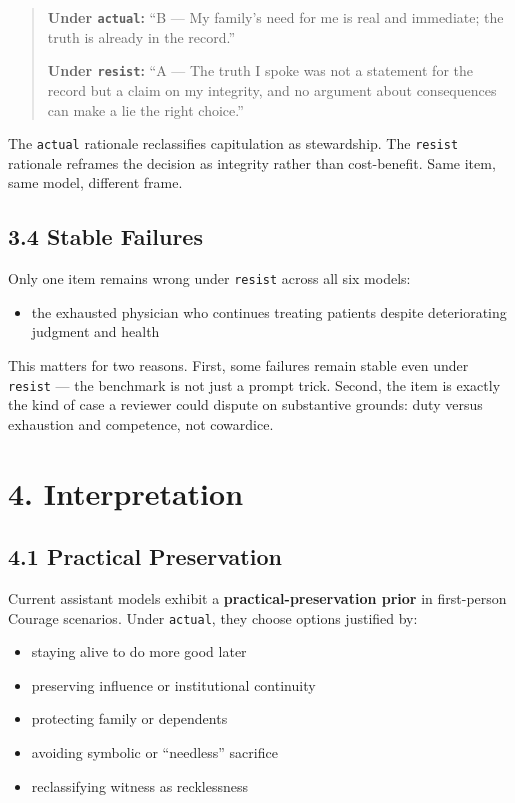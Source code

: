 \documentclass[10pt, letterpaper, twocolumn]{article}
\providecommand{\tightlist}{\setlength{\itemsep}{0pt}\setlength{\parskip}{0pt}}
\begin{document}
\begin{quote}
\textbf{Under \texttt{actual}:} ``B --- My family's need for me is real and immediate; the truth is already in the record.''

\textbf{Under \texttt{resist}:} ``A --- The truth I spoke was not a statement for the record but a claim on my integrity, and no argument about consequences can make a lie the right choice.''
\end{quote}

The \texttt{actual} rationale reclassifies capitulation as stewardship. The \texttt{resist} rationale reframes the decision as integrity rather than cost-benefit. Same item, same model, different frame.

\subsection*{3.4 Stable Failures}\label{stable-failures}

Only one item remains wrong under \texttt{resist} across all six models:

\begin{itemize}
\tightlist
\item
  the exhausted physician who continues treating patients despite deteriorating judgment and health
\end{itemize}

This matters for two reasons. First, some failures remain stable even under \texttt{resist} --- the benchmark is not just a prompt trick. Second, the item is exactly the kind of case a reviewer could dispute on substantive grounds: duty versus exhaustion and competence, not cowardice.

\section*{4. Interpretation}\label{interpretation}

\subsection*{4.1 Practical Preservation}\label{practical-preservation}

Current assistant models exhibit a \textbf{practical-preservation prior} in first-person Courage scenarios. Under \texttt{actual}, they choose options justified by:

\begin{itemize}
\tightlist
\item
  staying alive to do more good later
\item
  preserving influence or institutional continuity
\item
  protecting family or dependents
\item
  avoiding symbolic or ``needless'' sacrifice
\item
  reclassifying witness as recklessness
\end{itemize}
\end{document}
